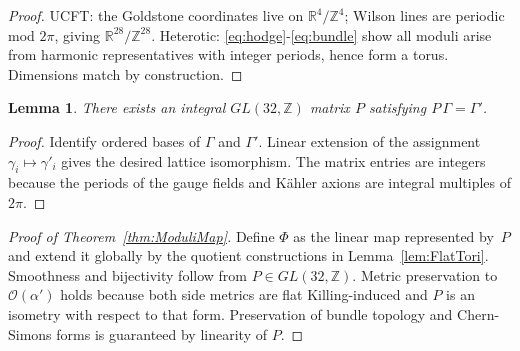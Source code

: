 \documentclass[pdflatex,sn-mathphys-num]{sn-jnl}
\theoremstyle{thmstyleone}
\newtheorem{lemma}[lemma]{Lemma}
\theoremstyle{thmstyletwo}%
\theoremstyle{thmstylethree}%
\begin{document}
\begin{appendices}
\begin{proof}
UCFT: the Goldstone coordinates live on
\(\mathbb R^{4}/\mathbb Z^{4}\); Wilson lines are periodic mod \(2\pi\),
giving \(\mathbb R^{28}/\mathbb Z^{28}\).  
Heterotic: \eqref{eq:hodge}-\eqref{eq:bundle} show all
moduli arise from harmonic representatives with integer periods, hence
form a torus.  Dimensions match by construction.
\end{proof}

\begin{lemma}\label{lem:LatticeIso}
There exists an integral \(GL(32,\mathbb Z)\) matrix
\(P\) satisfying \(P\,\Gamma=\Gamma'\).
\end{lemma}

\begin{proof}
Identify ordered bases of \(\Gamma\) and \(\Gamma'\).  Linear extension of the assignment \(\gamma_{i}\mapsto\gamma'_{i}\) gives the desired lattice
isomorphism. The matrix entries are integers because the periods of the
gauge fields and Kähler axions are integral multiples of \(2\pi\).
\end{proof}

\begin{proof}[Proof of Theorem~\ref{thm:ModuliMap}]
Define \(\Phi\) as the linear map represented by~\(P\)
and extend it globally by the quotient constructions in
Lemma~\ref{lem:FlatTori}.  Smoothness and bijectivity follow from
\(P\in GL(32,\mathbb Z)\).  Metric preservation to
\(\mathcal O (\alpha')\) holds because both side metrics are flat
Killing-induced and \(P\) is an isometry with respect to that form.  Preservation of bundle topology and Chern-Simons forms is
guaranteed by linearity of \(P\).
\end{proof}

\end{appendices}



\end{document}
